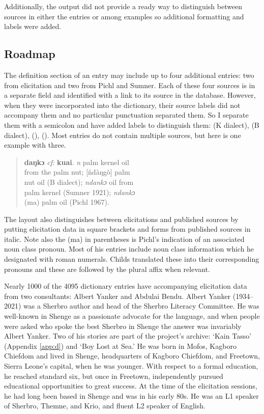 Additionally, the output did not provide a ready way to distinguish between sources in either the entries or among examples so additional formatting and labels were added.  


\subsection{Roadmap}
The definition section of an entry may include up to four additional entries: two from elicitation and two from Pichl and Sumner. Each of these four sources is in a separate field and identified with a link to its source in the database. However, when they were incorporated into the dictionary, their source labels did not accompany them and no particular punctuation separated them. So I separate them with a semicolon and have added labels to distinguish them: (K dialect), (B dialect), (\citealt{Pichl1967}), (\citealt{Sumner1921}). Most entries do not contain multiple sources, but here is one example with three. 

\begin{quote}
    \textbf{daŋkɔ} \textit{cf:} \textbf{kuai}. \textit{n} palm kernel oil\\
from the palm nut; [ǹdàŋgò] palm\\
nut oil (B dialect); \textit{ndankɔ} oil from\\
palm kernel (Sumner 1921); \textit{ndankɔ}\\
(ma) palm oil (Pichl 1967).\\
\end{quote}

The layout also distinguishes between elicitations and published sources by putting elicitation data in square brackets and forms from published sources in italic. Note also the (ma) in parentheses is Pichl’s indication of an associated noun class pronoun. Most of his entries include noun class information which he designated with roman numerals. Childs translated these into their corresponding pronouns and these are followed by the plural affix when relevant. 

Nearly 1000 of the 4095 dictionary entries have accompanying elicitation data from two consultants: Albert Yanker and Abdulai Bendu. Albert Yanker (1934–2021) was a Sherbro author and head of the Sherbro Literacy Committee. He was well-known in Shenge as a passionate advocate for the language, and when people were asked who spoke the best Sherbro in Shenge the answer was invariably Albert Yanker. Two of his stories are part of the project’s archive: ‘Kain Tasso’ (Appendix \ref{app:d}) and ‘Boy Lost at Sea.’ He was born in Mofos, Kagboro Chiefdom and lived in Shenge, headquarters of Kagboro Chiefdom, and Freetown, Sierra Leone’s capital, when he was younger. With respect to a formal education, he reached standard six, but once in Freetown, independently pursued educational opportunities to great success. At the time of the elicitation sessions, he had long been based in Shenge and was in his early 80s. He was an L1 speaker of Sherbro, Themne, and Krio, and fluent L2 speaker of English.

